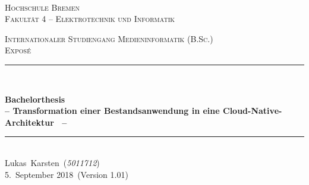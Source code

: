 \documentclass[11pt]{scrartcl}
\newcommand{\MetaInstitute}{Hochschule Bremen}
\newcommand{\MetaUnit}{Fakultät 4 -- Elektrotechnik und Informatik}
\newcommand{\MetaTitle}{Bachelorthesis}
\newcommand{\MetaSubtitle}{Transformation einer Bestandsanwendung in eine Cloud-Native-Architektur
}
\newcommand{\MetaTask}{Exposé}
\newcommand{\MetaAuthorName}{Lukas}
\newcommand{\MetaAuthorSurname}{Karsten}
\newcommand{\MetaAuthor}{\MetaAuthorName~\MetaAuthorSurname}
\newcommand{\MetaStudentNumber}{\textit{5011712}}
\newcommand{\MetaStudyProgram}{Internationaler Studiengang Medieninformatik (B.Sc.)}
\newcommand{\MetaDate}{5.\ September 2018}
\newcommand{\MetaVersion}{1.01}
\newcommand{\HRule}{\rule{\linewidth}{0.2mm}}	%
\begin{document}
\begin{titlepage}
  	\shortdate %
  	\center %

  	~\\[1cm]


	\begin{figure}[h!]
    		\centering
	\end{figure}

	\vspace{-0.5cm}
	\textsc{\Large \MetaInstitute}\\[0.2cm] %
	\textsc{\Large \MetaUnit}%
	
	\textsc{\large \MetaStudyProgram}\\[1.5cm]
	
	\textsc{\LARGE \MetaTask}\\[1.5cm] %

	\HRule \\[0.5cm]
	{
		\LARGE \bfseries \MetaTitle \\[0.50cm] %
		\Large \bfseries -- \MetaSubtitle\ -- \\[0.50cm] %
		\par
	}
	\HRule \\[1.5cm]

	\large 
	\MetaAuthor\ (\MetaStudentNumber)\
	\MetaCoAuthor\\[0.25cm]

	\vspace*{\fill}
	{
     \large \MetaDate\ (Version \MetaVersion)
	}
\end{titlepage}
\end{document}
